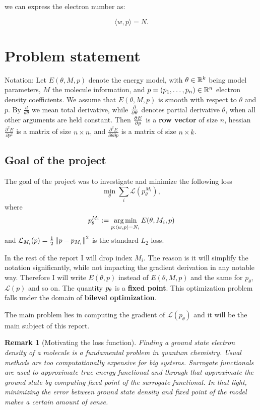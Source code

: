 \documentclass[a4paper,10.5pt]{report}
\newtheorem{remark}{Remark}
\begin{document}
we can express the electron number as:

\[
\langle w, p \rangle = N.
\]



\newpage

\section{Problem statement}
Notation: Let $E(\theta, M ,p)$ denote the energy model, with $\theta \in \mathbb{R}^k$ being model parameters, $M$ the molecule information, and $p=(p_1, \ldots ,p_n )\in \mathbb{R}^n$ electron density coefficients.  We assume that $E(\theta, M ,p)$ is smooth with respect to $\theta$ and $p$.
By $\frac{d}{d\theta}$ we mean total derivative, while $\frac{\partial }{\partial \theta}$ denotes partial derivative $\theta$, when all other arguments are held constant. Then $\frac{\partial E}{\partial p}$ is a \textbf{row vector} of size $n$, hessian $\frac{\partial^2 E}{ \partial p^2 }$ is a matrix of size $n \times n$, and $\frac{\partial^2 E}{\partial \theta \partial p}$ is a matrix of size $n \times k $.


\subsection{Goal of the project}
The goal of the project was to investigate and minimize the following loss
\begin{equation}\label{bilevel}
 \min_\theta \sum_i \mathcal{L}(p_{\theta}^{M_i}),
\end{equation}
where
\begin{equation}
  p_\theta^{M_i}:=\operatorname*{arg\,min}_{p : \langle w, p \rangle=N_i} E(\theta,M_i,p)
\end{equation}
and $\mathcal{L}_{M_i}(p) = \frac{1}{2}\left\|p-p_{M_i}\right\|^2$ is the standard $L_2$ loss.

In the rest of the report I will drop index $M_i$. The reason is it will simplify the notation significantly, while not impacting the gradient derivation in any notable way.
Therefore I will write $E(\theta,p)$ instead of $E(\theta,M,p)$ and the same for $p_\theta$, $\mathcal{L}(p)$ and so on.
The quantity $p_\theta$ is a \textbf{fixed point}.
This optimization problem falls under the domain of \textbf{bilevel optimization}.

The main problem lies in computing the gradient of $\mathcal{L}(p_\theta)$ and it will be the main subject of this report.

\begin{remark}[Motivating the loss function] Finding a ground state electron density of a molecule is a fundamental problem in quantum chemistry. Usual methods are too computationally expensive for big systems. Surrogate functionals are used to approximate true energy functional and through that approximate the ground state by computing fixed point of the surrogate functional. In that light, minimizing the error between ground state density and fixed point of the model makes a certain amount of sense.
\end{remark}
\end{document}

